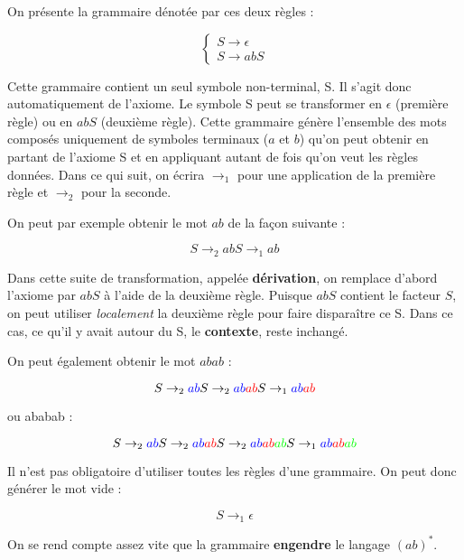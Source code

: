 \begin{example}
On présente la grammaire dénotée par ces deux règles :

\[
\begin{cases}
S \rightarrow \epsilon \\
S \rightarrow abS 
\end{cases}
\]

Cette grammaire contient un seul symbole non-terminal, S. Il s'agit donc automatiquement de l'axiome. Le symbole S peut se transformer en $\epsilon$ (première règle) ou en $abS$ (deuxième règle). Cette grammaire génère l'ensemble des mots composés uniquement de symboles terminaux ($a$ et $b$) qu'on peut obtenir en partant de l'axiome S et en appliquant autant de fois qu'on veut les règles données. Dans ce qui suit, on écrira $\rightarrow_1$ pour une application de la première règle et $\rightarrow_2$ pour la seconde.

On peut par exemple obtenir le mot $ab$ de la façon suivante :

\[
S \rightarrow_2 abS \rightarrow_1 ab
\]

Dans cette suite de transformation, appelée \textbf{dérivation}, on remplace d'abord l'axiome par $abS$ à l'aide de la deuxième règle. Puisque $abS$ contient le facteur $S$, on peut utiliser \textit{localement} la deuxième règle pour faire disparaître ce S. Dans ce cas, ce qu'il y avait autour du S, le \textbf{contexte}, reste inchangé.

On peut également obtenir le mot $abab$ :

\[
S \rightarrow_2 \textcolor{blue}{ab}S \rightarrow_2 \textcolor{blue}{ab}\textcolor{red}{ab}S \rightarrow_1 \textcolor{blue}{ab}\textcolor{red}{ab}
\]

ou ababab :


\[
S \rightarrow_2 \textcolor{blue}{ab}S \rightarrow_2 \textcolor{blue}{ab}\textcolor{red}{ab}S \rightarrow_2 \textcolor{blue}{ab}\textcolor{red}{ab}\textcolor{green}{ab}S \rightarrow_1  \textcolor{blue}{ab}\textcolor{red}{ab}\textcolor{green}{ab}
\]

Il n'est pas obligatoire d'utiliser toutes les règles d'une grammaire. On peut donc générer le mot vide :

\[
S \rightarrow_1 \epsilon
\]

On se rend compte assez vite que la grammaire \textbf{engendre} le langage $(ab)^*$.

\end{example}


